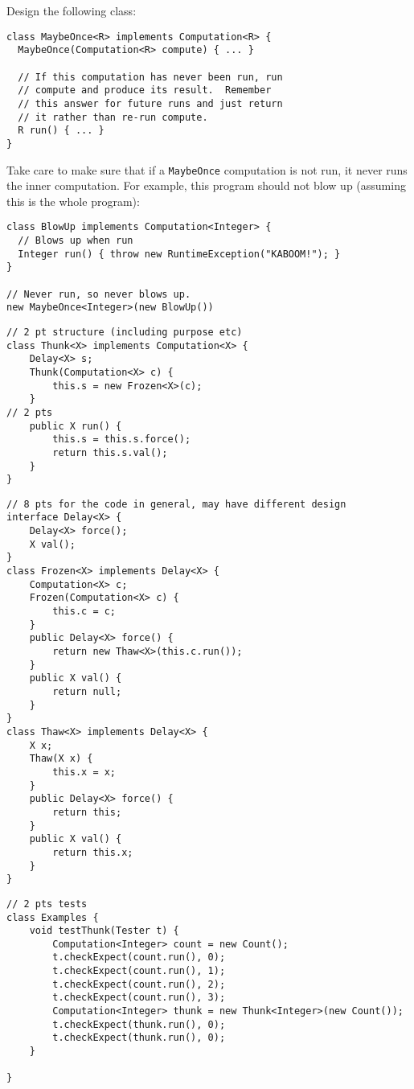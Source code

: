 \documentclass[12pt]{article}                   %
\newenvironment{solution}{\color{Red}}{}
\begin{document}
\begin{problem}
\begin{enumerate}
Design the following class:

\begin{verbatim}
class MaybeOnce<R> implements Computation<R> {
  MaybeOnce(Computation<R> compute) { ... }

  // If this computation has never been run, run
  // compute and produce its result.  Remember
  // this answer for future runs and just return
  // it rather than re-run compute.
  R run() { ... }
}
\end{verbatim}

Take care to make sure that if a \texttt{MaybeOnce} computation is not
run, it never runs the inner computation.  For example, 
this program should not blow up (assuming this is the whole program):

\begin{verbatim}
class BlowUp implements Computation<Integer> {
  // Blows up when run
  Integer run() { throw new RuntimeException("KABOOM!"); }
}

// Never run, so never blows up.
new MaybeOnce<Integer>(new BlowUp())
\end{verbatim}
\end{enumerate}

\begin{solution}
\newpage
\begin{verbatim}
// 2 pt structure (including purpose etc)
class Thunk<X> implements Computation<X> {
    Delay<X> s;
    Thunk(Computation<X> c) {
        this.s = new Frozen<X>(c);
    }
// 2 pts 
    public X run() {
        this.s = this.s.force();
        return this.s.val();
    }
}
\end{verbatim}
\newpage
\begin{verbatim}
// 8 pts for the code in general, may have different design
interface Delay<X> {
    Delay<X> force();
    X val();
}
class Frozen<X> implements Delay<X> {
    Computation<X> c;
    Frozen(Computation<X> c) {
        this.c = c;
    }
    public Delay<X> force() {
        return new Thaw<X>(this.c.run());
    }
    public X val() {
        return null;
    }
}
class Thaw<X> implements Delay<X> {
    X x;
    Thaw(X x) {
        this.x = x;
    }
    public Delay<X> force() {
        return this;
    }
    public X val() {
        return this.x;
    }
}
\end{verbatim}
\newpage
\begin{verbatim}
// 2 pts tests
class Examples {
    void testThunk(Tester t) {
        Computation<Integer> count = new Count();
        t.checkExpect(count.run(), 0);
        t.checkExpect(count.run(), 1);
        t.checkExpect(count.run(), 2);
        t.checkExpect(count.run(), 3);
        Computation<Integer> thunk = new Thunk<Integer>(new Count());
        t.checkExpect(thunk.run(), 0);
        t.checkExpect(thunk.run(), 0);
    }
    
}
\end{verbatim}
\end{solution}

\ifrubric
\else
{}
\fi
\newpage
\newpage

\end{problem}
\end{document}

